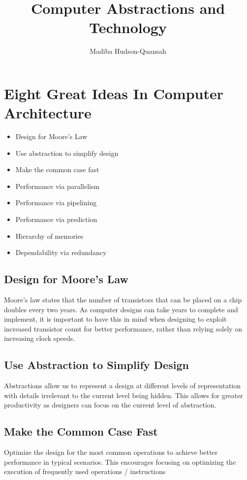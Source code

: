 \documentclass[12pt letter]{report}
\title{\Huge{Computer Abstractions and Technology}}
\author{\huge{Madiba Hudson-Quansah}}
\date{}
\begin{document}
\maketitle
\newpage
{}
\tableofcontents
\pagebreak


\chapter{Eight Great Ideas In Computer Architecture}

\begin{itemize}
  \item Design for Moore's Law
  \item Use abstraction to simplify design
  \item Make the common case fast
  \item Performance via parallelism
  \item Performance via pipelining
  \item Performance via prediction
  \item  Hierarchy of memories
  \item Dependability via redundancy
\end{itemize}

\section{Design for Moore's Law}
Moore's law states that the number of transistors that can be placed on a chip doubles every two years. As computer
designs can take years to complete and implement, it is important to have this in mind when designing to exploit
increased transistor count for better performance, rather than relying solely on increasing clock speeds.

\section{Use Abstraction to Simplify Design}
Abstractions allow us to represent a design at different levels of representation with details irrelevant to the current
level being hidden. This allows for greater productivity as  designers can focus on the current level of abstraction.

\section{Make the Common Case Fast}
Optimize the design for the most common operations to achieve better performance in typical scenarios. This encourages
focusing on optimizing the execution of frequently used operations / instructions
\end{document}
